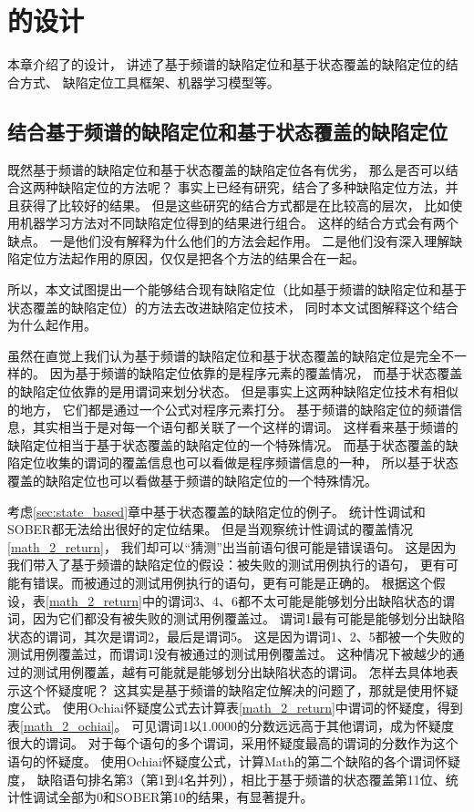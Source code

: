 \chapter{\toolname{}的设计}

本章介绍了\toolname{}的设计，
讲述了基于频谱的缺陷定位和基于状态覆盖的缺陷定位的结合方式、
缺陷定位工具框架、机器学习模型等。

\section{结合基于频谱的缺陷定位和基于状态覆盖的缺陷定位}
\label{sec:approach_comb}

既然基于频谱的缺陷定位和基于状态覆盖的缺陷定位各有优劣，
那么是否可以结合这两种缺陷定位的方法呢？
事实上已经有研究\parencite{Le2016A,Xuan2014Learning}，结合了多种缺陷定位方法，并且获得了比较好的结果。
但是这些研究的结合方式都是在比较高的层次，
比如使用机器学习方法对不同缺陷定位得到的结果进行组合。
这样的结合方式会有两个缺点。
一是他们没有解释为什么他们的方法会起作用。
二是他们没有深入理解缺陷定位方法起作用的原因，仅仅是把各个方法的结果合在一起。

所以，本文试图提出一个能够结合现有缺陷定位（比如基于频谱的缺陷定位和基于状态覆盖的缺陷定位）的方法去改进缺陷定位技术，
同时本文试图解释这个结合为什么起作用。

虽然在直觉上我们认为基于频谱的缺陷定位和基于状态覆盖的缺陷定位是完全不一样的。
因为基于频谱的缺陷定位依靠的是程序元素的覆盖情况，
而基于状态覆盖的缺陷定位依靠的是用谓词来划分状态。
但是事实上这两种缺陷定位技术有相似的地方，
它们都是通过一个公式对程序元素打分。
基于频谱的缺陷定位的频谱信息，其实相当于是对每一个语句都关联了一个这样的谓词。
这样看来基于频谱的缺陷定位相当于基于状态覆盖的缺陷定位的一个特殊情况。
而基于状态覆盖的缺陷定位收集的谓词的覆盖信息也可以看做是程序频谱信息的一种，
所以基于状态覆盖的缺陷定位也可以看做基于频谱的缺陷定位的一个特殊情况。

考虑\ref{sec:state_based}章中基于状态覆盖的缺陷定位的例子。
统计性调试和SOBER都无法给出很好的定位结果。
但是当观察统计性调试的覆盖情况\ref{math_2_return}，
我们却可以“猜测”出当前语句很可能是错误语句。
这是因为我们带入了基于频谱的缺陷定位的假设：被失败的测试用例执行的语句，
更有可能有错误。而被通过的测试用例执行的语句，更有可能是正确的。
根据这个假设，表\ref{math_2_return}中的谓词3、4、6都不太可能是能够划分出缺陷状态的谓词，因为它们都没有被失败的测试用例覆盖过。
谓词1最有可能是能够划分出缺陷状态的谓词，其次是谓词2，最后是谓词5。
这是因为谓词1、2、5都被一个失败的测试用例覆盖过，而谓词1没有被通过的测试用例覆盖过。
这种情况下被越少的通过的测试用例覆盖，越有可能就是能够划分出缺陷状态的谓词。
怎样去具体地表示这个怀疑度呢？
这其实是基于频谱的缺陷定位解决的问题了，那就是使用怀疑度公式。
使用Ochiai怀疑度公式去计算表\ref{math_2_return}中谓词的怀疑度，得到表\ref{math_2_ochiai}。
可见谓词1以1.0000的分数远远高于其他谓词，成为怀疑度很大的谓词。
对于每个语句的多个谓词，采用怀疑度最高的谓词的分数作为这个语句的怀疑度。
使用Ochiai怀疑度公式，计算Math的第二个缺陷的各个谓词怀疑度，
缺陷语句排名第3（第1到4名并列），相比于基于频谱的状态覆盖第11位、统计性调试全部为0和SOBER第10的结果，有显著提升。

